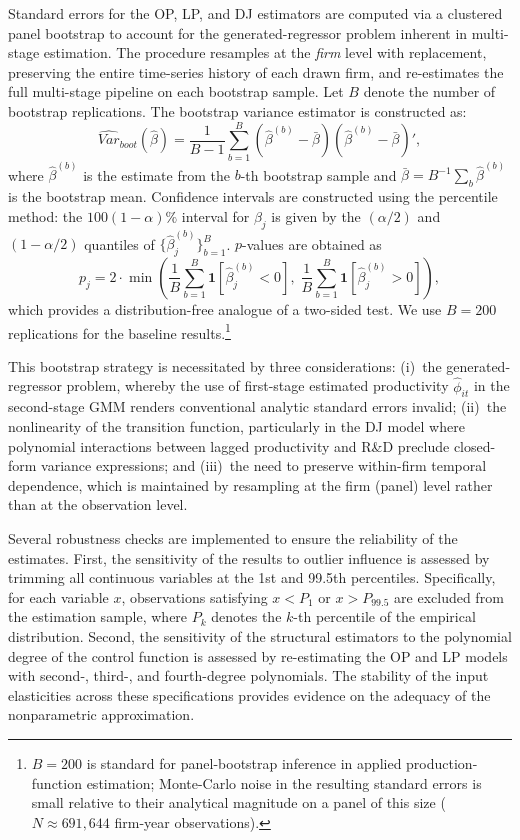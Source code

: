 \documentclass[a4paper, 12pt]{article}
\let\origfootnote\footnote
\renewcommand{\footnote}[1]{\origfootnote{\setstretch{1.0}\fontsize{10pt}{12pt}\selectfont #1}}
\begin{document}
Standard errors for the OP, LP, and DJ estimators are computed via a clustered panel bootstrap to account for the generated-regressor problem inherent in multi-stage estimation. The procedure resamples at the \emph{firm} level with replacement, preserving the entire time-series history of each drawn firm, and re-estimates the full multi-stage pipeline on each bootstrap sample. Let $B$ denote the number of bootstrap replications. The bootstrap variance estimator is constructed as:
\begin{equation}
\widehat{Var}_{boot}(\hat{\beta}) = \frac{1}{B-1} \sum_{b=1}^{B} (\hat{\beta}^{(b)} - \bar{\beta})(\hat{\beta}^{(b)} - \bar{\beta})',
\end{equation}
where $\hat{\beta}^{(b)}$ is the estimate from the $b$-th bootstrap sample and $\bar{\beta} = B^{-1}\sum_{b}\hat{\beta}^{(b)}$ is the bootstrap mean. Confidence intervals are constructed using the percentile method: the $100(1-\alpha)\%$ interval for $\beta_j$ is given by the $(\alpha/2)$ and $(1-\alpha/2)$ quantiles of $\{\hat{\beta}_j^{(b)}\}_{b=1}^{B}$. $p$-values are obtained as
\begin{equation}
p_j = 2 \cdot \min\!\left(
    \frac{1}{B}\sum_{b=1}^{B}\mathbf{1}[\hat{\beta}_j^{(b)} < 0],\;
    \frac{1}{B}\sum_{b=1}^{B}\mathbf{1}[\hat{\beta}_j^{(b)} > 0]
\right),
\end{equation}
which provides a distribution-free analogue of a two-sided test. We use $B = 200$ replications for the baseline results.\footnote{$B = 200$ is standard for panel-bootstrap inference in applied production-function estimation; Monte-Carlo noise in the resulting standard errors is small relative to their analytical magnitude on a panel of this size ($N \approx 691{,}644$ firm-year observations).}

This bootstrap strategy is necessitated by three considerations: (i)~the generated-regressor problem, whereby the use of first-stage estimated productivity $\hat{\phi}_{it}$ in the second-stage GMM renders conventional analytic standard errors invalid; (ii)~the nonlinearity of the transition function, particularly in the DJ model where polynomial interactions between lagged productivity and R\&D preclude closed-form variance expressions; and (iii)~the need to preserve within-firm temporal dependence, which is maintained by resampling at the firm (panel) level rather than at the observation level.


Several robustness checks are implemented to ensure the reliability of the estimates. First, the sensitivity of the results to outlier influence is assessed by trimming all continuous variables at the 1st and 99.5th percentiles. Specifically, for each variable $x$, observations satisfying $x < P_{1}$ or $x > P_{99.5}$ are excluded from the estimation sample, where $P_{k}$ denotes the $k$-th percentile of the empirical distribution. Second, the sensitivity of the structural estimators to the polynomial degree of the control function is assessed by re-estimating the OP and LP models with second-, third-, and fourth-degree polynomials. The stability of the input elasticities across these specifications provides evidence on the adequacy of the nonparametric approximation.
\end{document}
